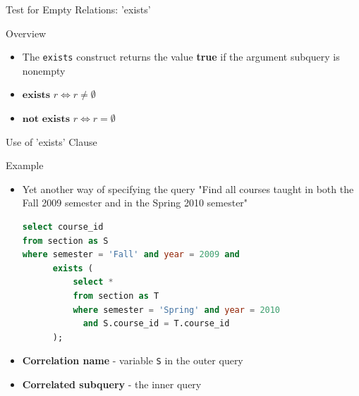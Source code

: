 \documentclass[aspectratio=169, xcolor=dvipsnames]{beamer}
\begin{document}
\begin{frame}{Test for Empty Relations: 'exists'}
    \begin{block}{Overview}
        \begin{itemize}[<+->]
            \item The \texttt{exists} construct returns the value \textbf{true} if the argument subquery is nonempty
            \vspace{1em}
            \item $\textbf{exists } r \Leftrightarrow r \neq \emptyset$
            \vspace{0.5em}
            \item $\textbf{not exists } r \Leftrightarrow r = \emptyset$
        \end{itemize}
    \end{block}
\end{frame}

\begin{frame}[fragile]{Use of 'exists' Clause}
    \begin{exampleblock}{Example}
        \begin{itemize}[<+->]
            \item Yet another way of specifying the query "Find all courses taught in both the Fall 2009 semester and in the Spring 2010 semester"
            \begin{lstlisting}[language=SQL, basicstyle=\ttfamily\scriptsize]
select course_id 
from section as S 
where semester = 'Fall' and year = 2009 and 
      exists ( 
          select * 
          from section as T 
          where semester = 'Spring' and year = 2010 
            and S.course_id = T.course_id 
      );
            \end{lstlisting}
            \item \textbf{Correlation name} - variable \texttt{S} in the outer query
            \item \textbf{Correlated subquery} - the inner query
        \end{itemize}
    \end{exampleblock}
\end{frame}
\end{document}
